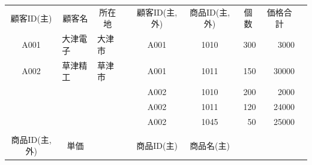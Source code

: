 \documentclass[dvipdfmx,autodetect-engine,titlepage]{jsarticle}
\begin{document}
\begin{table}[h]
  \centering
  \begin{tabular}{cllccclll}
  \cline{1-3} \cline{5-8}
  \multicolumn{1}{|c|}{顧客ID(主)}   & \multicolumn{1}{c|}{顧客名}  & \multicolumn{1}{c|}{所在地} & \multicolumn{1}{c|}{} & \multicolumn{1}{c|}{顧客ID(主,外)} & \multicolumn{1}{c|}{商品ID(主,外)} & \multicolumn{1}{c|}{個数}  & \multicolumn{1}{c|}{価格合計}  &                      \\ \cline{1-3} \cline{5-8}
  \multicolumn{1}{|c|}{A001}      & \multicolumn{1}{l|}{大津電子} & \multicolumn{1}{l|}{大津市} & \multicolumn{1}{l|}{} & \multicolumn{1}{c|}{A001}      & \multicolumn{1}{c|}{1010}      & \multicolumn{1}{r|}{300} & \multicolumn{1}{r|}{3000}  & \multicolumn{1}{c}{} \\ \cline{1-3} \cline{5-8}
  \multicolumn{1}{|c|}{A002}      & \multicolumn{1}{l|}{草津精工} & \multicolumn{1}{l|}{草津市} & \multicolumn{1}{l|}{} & \multicolumn{1}{c|}{A001}      & \multicolumn{1}{c|}{1011}      & \multicolumn{1}{r|}{150} & \multicolumn{1}{r|}{30000} & \multicolumn{1}{c}{} \\ \cline{1-3} \cline{5-8}
  \multicolumn{1}{l}{}            &                           &                          & \multicolumn{1}{l|}{} & \multicolumn{1}{c|}{A002}      & \multicolumn{1}{c|}{1010}      & \multicolumn{1}{r|}{200} & \multicolumn{1}{r|}{2000}  & \multicolumn{1}{c}{} \\ \cline{5-8}
  \multicolumn{1}{l}{}            &                           &                          & \multicolumn{1}{l|}{} & \multicolumn{1}{c|}{A002}      & \multicolumn{1}{c|}{1011}      & \multicolumn{1}{r|}{120} & \multicolumn{1}{r|}{24000} & \multicolumn{1}{c}{} \\ \cline{5-8}
                                  & \multicolumn{1}{c}{}      &                          & \multicolumn{1}{c|}{} & \multicolumn{1}{c|}{A002}      & \multicolumn{1}{c|}{1045}      & \multicolumn{1}{r|}{50}  & \multicolumn{1}{r|}{25000} & \multicolumn{1}{c}{} \\ \cline{5-8}
                                  & \multicolumn{1}{r}{}      &                          &                       &                                & \multicolumn{1}{l}{}           &                          &                            &                      \\ \cline{1-2} \cline{5-6}
  \multicolumn{1}{|c|}{商品ID(主,外)} & \multicolumn{1}{c|}{単価}   & \multicolumn{1}{c}{}     & \multicolumn{1}{c|}{} & \multicolumn{1}{c|}{商品ID(主)}   & \multicolumn{1}{c|}{商品名(主)}    &                          &                            &                      \\ \cline{1-2} \cline{5-6}

\end{tabular}
\end{table}
\end{document}
